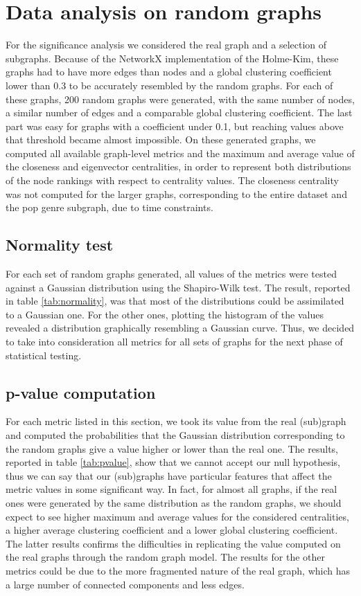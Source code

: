 \section{Data analysis on random graphs}

For the significance analysis we considered the real graph and a selection of subgraphs. Because of the NetworkX implementation of the Holme-Kim, these graphs had to have more edges than nodes and a global clustering coefficient lower than 0.3 to be accurately resembled by the random graphs. For each of these graphs, 200 random graphs were generated, with the same number of nodes, a similar number of edges and a comparable global clustering coefficient. The last part was easy for graphs with a coefficient under 0.1, but reaching values above that threshold became almost impossible. On these generated graphs, we computed all available graph-level metrics and the maximum and average value of the closeness and eigenvector centralities, in order to represent both distributions of the node rankings with respect to centrality values. The closeness centrality was not computed for the larger graphs, corresponding to the entire dataset and the pop genre subgraph, due to time constraints.

\subsection{Normality test}

For each set of random graphs generated, all values of the metrics were tested against a Gaussian distribution using the Shapiro-Wilk test. The result, reported in table \ref{tab:normality}, was that most of the distributions could be assimilated to a Gaussian one. For the other ones, plotting the histogram of the values revealed a distribution graphically resembling a Gaussian curve. Thus, we decided to take into consideration all metrics for all sets of graphs for the next phase of statistical testing.

\subsection{p-value computation}

For each metric listed in this section, we took its value from the real (sub)graph and computed the probabilities that the Gaussian distribution corresponding to the random graphs give a value higher or lower than the real one. The results, reported in table \ref{tab:pvalue}, show that we cannot accept our null hypothesis, thus we can say that our (sub)graphs have particular features that affect the metric values in some significant way. In fact, for almost all graphs, if the real ones were generated by the same distribution as the random graphs, we should expect to see higher maximum and average values for the considered centralities, a higher average clustering coefficient and a lower global clustering coefficient. The latter results confirms the difficulties in replicating the value computed on the real graphs through the random graph model. The results for the other metrics could be due to the more fragmented nature of the real graph, which has a large number of connected components and less edges.
